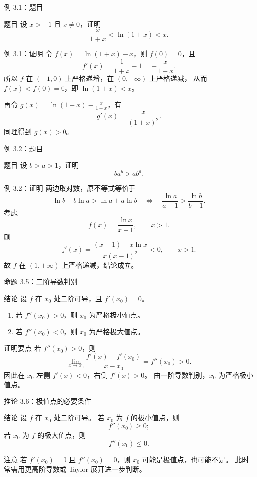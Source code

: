 \documentclass[aspectratio=169,10pt]{ctexbeamer}
\begin{document}
\begin{frame}{例 3.1：题目}
\small
\begin{block}{题目}
设 $x>-1$ 且 $x\ne0$，证明
\[
  \frac{x}{1+x}<\ln(1+x)<x.
\]
\end{block}
\end{frame}

\begin{frame}{例 3.1：证明}
\small
令 $f(x)=\ln(1+x)-x$，则 $f(0)=0$，且
\[
  f'(x)=\frac1{1+x}-1=-\frac{x}{1+x}.
\]
所以 $f$ 在 $(-1,0)$ 上严格递增，在 $(0,+\infty)$ 上严格递减，
从而 $f(x)<f(0)=0$，即 $\ln(1+x)<x$。

再令 $g(x)=\ln(1+x)-\frac{x}{1+x}$，有
\[
  g'(x)=\frac{x}{(1+x)^2}.
\]
同理得到 $g(x)>0$。
\end{frame}

\begin{frame}{例 3.2：题目}
\small
\begin{block}{题目}
设 $b>a>1$，证明
\[
  ba^b>ab^a.
\]
\end{block}
\end{frame}

\begin{frame}{例 3.2：证明}
\small
两边取对数，原不等式等价于
\[
  \ln b+b\ln a>\ln a+a\ln b
  \quad\Longleftrightarrow\quad
  \frac{\ln a}{a-1}>\frac{\ln b}{b-1}.
\]
考虑
\[
  f(x)=\frac{\ln x}{x-1},\qquad x>1.
\]
则
\[
  f'(x)=\frac{(x-1)-x\ln x}{x(x-1)^2}<0,\qquad x>1.
\]
故 $f$ 在 $(1,+\infty)$ 上严格递减，结论成立。
\end{frame}

\begin{frame}{命题 3.5：二阶导数判别}
\small
\begin{block}{结论}
设 $f$ 在 $x_0$ 处二阶可导，且 $f'(x_0)=0$。
\begin{enumerate}
  \item 若 $f''(x_0)>0$，则 $x_0$ 为严格极小值点。
  \item 若 $f''(x_0)<0$，则 $x_0$ 为严格极大值点。
\end{enumerate}
\end{block}
\begin{block}{证明要点}
若 $f''(x_0)>0$，则
\[
  \lim_{x\to x_0}\frac{f'(x)-f'(x_0)}{x-x_0}=f''(x_0)>0.
\]
因此在 $x_0$ 左侧 $f'(x)<0$，右侧 $f'(x)>0$。
由一阶导数判别，$x_0$ 为严格极小值点。
\end{block}
\end{frame}

\begin{frame}{推论 3.6：极值点的必要条件}
\small
\begin{block}{结论}
设 $f$ 在 $x_0$ 处二阶可导。
若 $x_0$ 为 $f$ 的极小值点，则
\[
  f''(x_0)\ge0;
\]
若 $x_0$ 为 $f$ 的极大值点，则
\[
  f''(x_0)\le0.
\]
\end{block}
\begin{alertblock}{注意}
若 $f'(x_0)=0$ 且 $f''(x_0)=0$，则 $x_0$ 可能是极值点，也可能不是。
此时常需用更高阶导数或 Taylor 展开进一步判断。
\end{alertblock}
\end{frame}
\end{document}
